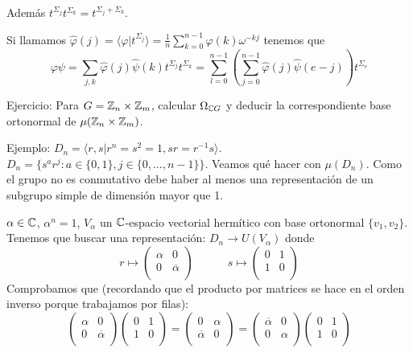 Además \(t^{\Sigma_j}t^{\Sigma_k}=t^{\Sigma_j+\Sigma_k}\).

Si llamamos \(\hat{\varphi}(j)=\langle\varphi|t^{\Sigma_j}\rangle
=\frac{1}{n}\sum_{k=0}^{n-1} \varphi(k)\omega^{-kj}\) tenemos que
\[
  \varphi\psi=\sum_{j,k}\hat{\varphi}(j)\hat{\psi}(k)t^{\Sigma_j}t^{\Sigma_k}
  =\sum_{l=0}^{n-1}\left(\sum_{j=0}^{n-1}\hat{\varphi}(j)\hat{\psi}(e-j)\right)
  t^{\Sigma_e}
\]

Ejercicio: Para \(G=\mathbb{Z}_n\times\mathbb{Z}_m\), calcular \(\Omega_{\mathbb{C} G}\) y deducir la
correspondiente base ortonormal de \(\mu(\mathbb{Z}_n\times\mathbb{Z}_m)\).

Ejemplo: \(D_n=\langle r,s | r^n = s^2 = 1, sr=r^{-1}s\rangle\).
\(D_n=\{s^a r^j:a \in\{0,1\}, j\in\{0,\ldots,n-1\}\}\).
Veamos qué hacer con \(\mu(D_n)\). Como el grupo no es conmutativo debe haber
al menos una representación de un subgrupo simple de dimensión mayor que 1.

\(\alpha\in\mathbb{C}\), \(\alpha^n=1\), \(V_\alpha\) un \(\mathbb{C}\)-espacio vectorial
hermítico con base ortonormal \(\{v_1, v_2\}\).
Tenemos que buscar una representación: \(D_n\longrightarrow U(V_\alpha)\)
donde
\[
  r\mapsto
  \begin{pmatrix}
    \alpha&0\\
    0&\overline{\alpha}\\
  \end{pmatrix}
\quad\quad\quad
  s\mapsto
  \begin{pmatrix}
    0&1\\
    1&0\\
  \end{pmatrix}
\]
Comprobamos que (recordando que el producto por matrices se hace en el orden
inverso porque trabajamos por filas):
\[
  \begin{pmatrix}
    \alpha&0\\
    0&\overline{\alpha}\\
  \end{pmatrix}
  \begin{pmatrix}
    0&1\\
    1&0\\
  \end{pmatrix}
  =
  \begin{pmatrix}
    0&\alpha\\
    \overline{\alpha}&0\\
  \end{pmatrix}
  =
  \begin{pmatrix}
    \overline{\alpha}&0\\
    0&\alpha\\
  \end{pmatrix}
  \begin{pmatrix}
    0&1\\
    1&0\\
  \end{pmatrix}
\]

